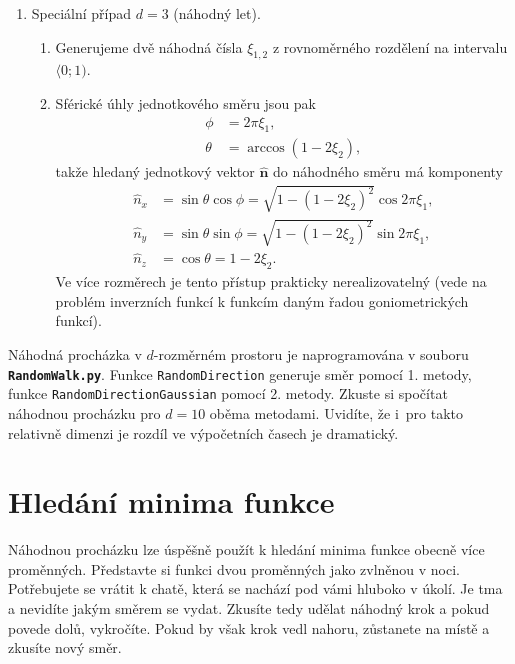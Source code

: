 \documentclass[a4paper,11pt,twoside]{article}
\def\vector#1{\boldsymbol{#1}}								%
\def\code#1{\textnormal{\texttt{#1}}}
\def\file#1{\textnormal{\textbf{\texttt{#1}}}}
\begin{document}
\begin{solution}
\begin{enumerate}
            \item Speciální případ $d=3$ (náhodný let).
                \begin{enumerate}
                    \item Generujeme dvě náhodná čísla $\xi_{1,2}$ z rovnoměrného rozdělení na intervalu $\langle0;1)$.
                    \item Sférické úhly jednotkového směru jsou pak
                        \begin{align}
                            \phi&=2\pi\xi_{1},\nonumber\\
                            \theta&=\arccos\left(1-2\xi_{2}\right),
                        \end{align}
                        takže hledaný jednotkový vektor $\vector{\hat{n}}$ do náhodného směru má komponenty
                        \begin{align}
                            \hat{n}_{x}
                                &=\sin\theta\cos\phi
                                =\sqrt{1-\left(1-2\xi_{2}\right)^{2}}\cos2\pi\xi_{1},\nonumber\\
                            \hat{n}_{y}
                                &=\sin\theta\sin\phi
                                =\sqrt{1-\left(1-2\xi_{2}\right)^{2}}\sin2\pi\xi_{1},\\
                            \hat{n}_{z}
                                &=\cos\theta
                                =1-2\xi_{2}.\nonumber
                        \end{align}
                        Ve více rozměrech je tento přístup prakticky nerealizovatelný (vede na problém inverzních funkcí k funkcím daným řadou goniometrických funkcí).
                \end{enumerate}
            \end{enumerate}

            Náhodná procházka v $d$-rozměrném prostoru je naprogramována v souboru \file{RandomWalk.py}.
            Funkce \code{RandomDirection} generuje směr pomocí 1. metody, funkce \code{RandomDirectionGaussian} pomocí 2. metody.
            Zkuste si spočítat náhodnou procházku pro $d=10$ oběma metodami.
            Uvidíte, že i~pro takto relativně  dimenzi je rozdíl ve výpočetních časech je dramatický.
    \end{solution}

\section{Hledání minima funkce}
    Náhodnou procházku lze úspěšně použít k hledání minima funkce obecně více proměnných.
    Představte si funkci dvou proměnných jako zvlněnou  v noci.
    Potřebujete se vrátit k chatě, která se nachází pod vámi hluboko v úkolí.
    Je tma a nevidíte jakým směrem se vydat.
    Zkusíte tedy udělat náhodný krok a pokud povede dolů, vykročíte.
    Pokud by však krok vedl nahoru, zůstanete na místě a zkusíte nový směr.
\end{document}
